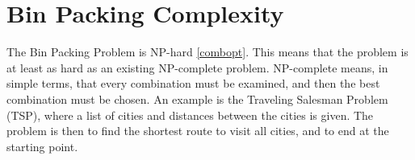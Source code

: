 \section{Bin Packing Complexity}
The Bin Packing Problem is NP-hard \ref{combopt}. This means that the problem is at least as hard as an existing NP-complete problem. NP-complete means, in simple terms, that every combination must be examined, and then the best combination must be chosen. An example is the Traveling Salesman Problem (TSP), where a list of cities and distances between the cities is given. The problem is then to find the shortest route to visit all cities, and to end at the starting point. 